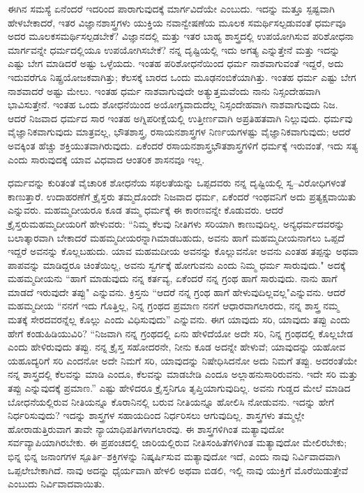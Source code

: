 ಈಗಿನ ಸಮಸ್ಯೆ ಏನೆಂದರೆ ಇದರಿಂದ ಪಾರಾಗುವುದಕ್ಕೆ ಮಾರ್ಗವಿದೆಯೇ ಎಂಬುದು. ಇದನ್ನು ಮತ್ತೂ ಸ್ಪಷ್ಟವಾಗಿ ಹೇಳಬೇಕಾದರೆ, ಇತರ ವಿಜ್ಞಾನಶಾಸ್ತ್ರಗಳು ಯುಕ್ತಿಯ ನವಾನ್ವೇಷಣೆಯ ಮೂಲಕ ಸಮರ್ಥಿಸಲ್ಪಡುವಂತೆ ಧರ್ಮವೂ ಅದರ ಮೂಲಕ\break ಸಮರ್ಥಿಸಲ್ಪಡಬೇಕೆ? ವಿಜ್ಞಾನದಲ್ಲಿ ಮತ್ತು ಇತರ ಬಾಹ್ಯ ಶಾಸ್ತ್ರದಲ್ಲಿ ಉಪಯೋಗಿಸುವ ಪರಿಶೋಧನಾ ಮಾರ್ಗವನ್ನೇ ಧರ್ಮದಲ್ಲಿಯೂ ಉಪಯೋಗಿಸಬೇಕೆ? ನನ್ನ ದೃಷ್ಟಿಯಲ್ಲಿ ಇದು ಅಗತ್ಯ ಎನ್ನುತ್ತೇನೆ ಮತ್ತು ಇದನ್ನು ಎಷ್ಟು ಬೇಗ ಮಾಡಿದರೆ ಅಷ್ಟು ಒಳ್ಳೆಯದು. ಇಂತಹ ಪರಿಶೋಧನೆಯಿಂದ ಧರ್ಮ ನಾಶವಾಗುವಂತೆ ಇದ್ದರೆ, ಅದು ಇದುವರೆಗೂ ನಿಷ್ಪ್ರಯೋಜಕವಾಗಿತ್ತು; ಕೆಲಸಕ್ಕೆ ಬಾರದ ಒಂದು ಮೂಢನಂಬಿಕೆಯಾಗಿತ್ತು. ಇಂತಹ ಧರ್ಮ ಎಷ್ಟು ಬೇಗ ನಾಶವಾದರೆ ಅಷ್ಟು ಮೇಲು. ಇಂತಹ ಧರ್ಮ ನಾಶವಾಗುವುದೇ ಅತ್ಯುತ್ತಮವೆಂದು ನಾನು ನಿಸ್ಸಂದೇಹವಾಗಿ ಭಾವಿಸುತ್ತೇನೆ. ಇಂತಹ ಒಂದು ಶೋಧನೆಯಿಂದ ಅಯೋಗ್ಯವಾದುದೆಲ್ಲ ನಿಸ್ಸಂದೇಹವಾಗಿ ನಾಶವಾಗುವುದು ನಿಜ. ಆದರೆ ನಿಜವಾದ ಧರ್ಮದ ಸಾರ ಇಂತಹ ಅಗ್ನಿಪರೀಕ್ಷೆಯಲ್ಲಿ ಉತ್ತೀರ್ಣವಾಗಿ ಅಪ್ರತಿಹತವಾಗಿ ನಿಲ್ಲುವುದು. ಧರ್ಮವು ವೈಜ್ಞಾನಿಕವಾಗುವುದು ಮಾತ್ರವಲ್ಲ, ಭೌತಶಾಸ್ತ್ರ, ರಸಾಯನಶಾಸ್ತ್ರಗಳ ನಿರ್ಣಯಗಳಷ್ಟು ವೈಜ್ಞಾನಿಕವಾಗುವುದು; ಆದರೆ ಅವಕ್ಕಿಂತ ಹೆಚ್ಚು ಶಕ್ತಿಯುತವಾಗಿರುವುದು. ಏಕೆಂದರೆ ರಸಾಯನಶಾಸ್ತ್ರಭೌತಶಾಸ್ತ್ರಗಳಿಗೆ ಧರ್ಮಕ್ಕೆ ಇರುವಂತೆ, ಇದು ಸತ್ಯ ಎಂದು ಸಾರುವುದಕ್ಕೆ ಯಾವ ವಿಧವಾದ ಆಂತರಿಕ ಶಾಸನವೂ ಇಲ್ಲ.

ಧರ್ಮವನ್ನು ಕುರಿತಂತೆ ವೈಚಾರಿಕ ಶೋಧನೆಯ ಸಫಲತೆಯನ್ನು ಒಪ್ಪದವರು ನನ್ನ ದೃಷ್ಟಿಯಲ್ಲಿ ಸ್ವ–ವಿರೋಧಿಗಳಂತೆ ಕಾಣುತ್ತಾರೆ. ಉದಾಹರಣೆಗೆ ಕ್ರೈಸ್ತರು ತಮ್ಮದೊಂದೇ ನಿಜವಾದ ಧರ್ಮ, ಏಕೆಂದರೆ ಇಂಥವನಿಗೆ ಅದು ಪ್ರತ್ಯಕ್ಷವಾಯಿತು ಎನ್ನುವರು. ಮಹಮ್ಮದೀಯರೂ ಕೂಡ ತಮ್ಮ ಧರ್ಮಕ್ಕೆ ಈ ಕಾರಣವನ್ನೇ ಕೊಡುವರು. ಆದರೆ ಕ್ರೈಸ್ತರು\break ಮಹಮ್ಮದೀಯರಿಗೆ ಹೇಳುವರು: “ನಿಮ್ಮ ಕೆಲವು ನೀತಿಗಳು ಸರಿಯಾಗಿ ಕಾಣುವುದಿಲ್ಲ. ಅನ್ಯಧರ್ಮದವರನ್ನು ಬಲಾತ್ಕಾರವಾಗಿ ಬೇಕಾದರೆ ಮಹಮ್ಮದೀಯರನ್ನಾಗಿ\break ಮಾಡಬಹುದು, ಅವನು ಹಾಗೆ ಮಹಮ್ಮದೀಯನಾಗಲು ಒಪ್ಪದೆ ಇದ್ದರೆ ಅವನನ್ನು ಕೊಲ್ಲಬಹುದು. ಯಾವ ಮಹಮದೀಯ ಅವನನ್ನು ಕೊಲ್ಲುವನೋ ಅವನು ಎಂತಹ ತಪ್ಪನ್ನು ಅಥವಾ ಪಾಪವನ್ನು ಮಾಡಿದ್ದರೂ ಚಿಂತೆಯಿಲ್ಲ, ಅವನು ಸ್ವರ್ಗಕ್ಕೆ ಹೋಗುವನು ಎಂದು ನಿಮ್ಮ ಧರ್ಮ ಸಾರುವುದು." ಅದಕ್ಕೆ ಮಹಮ್ಮದೀಯನು “ಹಾಗೆ ಮಾಡುವುದು ನನ್ನ ಕರ್ತವ್ಯ, ಏಕೆಂದರೆ ನನ್ನ ಗ್ರಂಥ ಹಾಗೆ ಸಾರುವುದು. ನಾನು ಹಾಗೆ ಮಾಡದೆ ಇರುವುದೇ ತಪ್ಪು" ಎನ್ನುವನು. ಕ್ರಿಸ್ತನು “ಆದರೆ ನನ್ನ ಗ್ರಂಥ ಹಾಗೆ ಹೇಳುವುದಿಲ್ಲವಲ್ಲ"\break ಎನ್ನುವನು. ಆದರೆ ಮಹಮ್ಮದೀಯ “ನನಗೆ ಇದು ಗೊತ್ತಿಲ್ಲ, ನಿನ್ನ ಗ್ರಂಥದ ಪ್ರಮಾಣ ನನಗೆ ಆಧಾರವಾಗಲಾರದು, ನನ್ನ ಶಾಸ್ತ್ರ ನಮ್ಮ ಮತಕ್ಕೆ ಸೇರದವರನ್ನೆಲ್ಲ ಕೊಲ್ಲು ಎಂದು ವಿಧಿಸುವುದು'' ಎನ್ನುವನು. ಈಗ ಯಾವುದು ಸರಿ, ಯಾವುದು ತಪ್ಪು ಎಂದು ಹೇಗೆ ಕಂಡುಹಿಡಿಯುವಿರಿ? “ನಿಜವಾಗಿ ನನ್ನ ಗ್ರಂಥದಲ್ಲಿ ಏನು ಹೇಳಿದೆಯೋ ಅದೇ ಸರಿ, ನಿನ್ನ ಗ್ರಂಥದಲ್ಲಿ ಕೊಲ್ಲಬೇಡ ಎಂದು ಹೇಳಿರುವುದು ತಪ್ಪು. ನನ್ನ ಕ್ರೈಸ್ತ ಸಹೋದರನೇ, ನೀನು ಕೂಡ ಅದನ್ನೇ ಹೇಳುವೆ; ಯಾವುದನ್ನು ಯಹೋವ ಯಹೂದ್ಯರಿಗೆ ಸರಿ ಎಂದನೋ ಅದೇ ನಿಮಗೆ ಸರಿ, ಯಾವುದನ್ನು ನಿಷೇಧಿಸಿದನೋ ಅದು ನಿಮಗೆ ತಪ್ಪು. ಅದರಂತೆಯೇ ನನ್ನ ಶಾಸ್ತ್ರದಲ್ಲಿ ಕೆಲವನ್ನು ಮಾಡಿ ಎಂದೂ, ಕೆಲವನ್ನು ಮಾಡಬೇಡಿ ಎಂದೂ ಅಲ್ಲಾಹನು\break ಸಾರಿರುವನು. ಇದೇ ಸರಿ ಮತ್ತು ತಪ್ಪು ಎನ್ನುವುದಕ್ಕೆ ಪ್ರಮಾಣ.” ಎಷ್ಟು ಹೇಳಿದರೂ ಕ್ರೈಸ್ತನಿಗೂ ತೃಪ್ತಿಯಾಗುವುದಿಲ್ಲ. ಅವನು ಗುಡ್ಡದ ಮೇಲೆ ಮಾಡಿದ ಬೋಧನೆಯಲ್ಲಿರುವ ನೀತಿಯನ್ನೂ ಕೊರಾನಿನಲ್ಲಿ ಬರುವ ನೀತಿಯನ್ನೂ ಹೋಲಿಸಿ ನೋಡುವನು. ಇದನ್ನು ಹೇಗೆ ನಿರ್ಧರಿಸುವುದು? ಇದನ್ನು ಶಾಸ್ತ್ರಗಳ ಸಹಾಯದಿಂದ ನಿರ್ಧರಿಸಲು ಆಗುವುದಿಲ್ಲ. ಶಾಸ್ತ್ರಗಳು ತಮ್ಮಲ್ಲೇ ಹೋರಾಡುತ್ತಿರುವಾಗ ತಾವೇ ನ್ಯಾಯಾಧಿಪತಿಗಳಾಗಲಾರವು. ಈ ಶಾಸ್ತ್ರಗಳಿಗಿಂತ ಮತ್ಯಾವುದೋ ಸರ್ವವ್ಯಾಪಿಯಾಗಿರಬೇಕು. ಈ ಪ್ರಪಂಚದಲ್ಲಿ ಜಾರಿಯಲ್ಲಿರುವ ನೀತಿಸಂಹಿತೆಗಳಿಗಿಂತ ಮತ್ಯಾವುದೋ ಮೇಲಿರಬೇಕು; ಭಿನ್ನ ಭಿನ್ನ ಜನಾಂಗಗಳ ಸ್ಪೂರ್ತಿ–ಶಕ್ತಿಗಳನ್ನು ನಿಷ್ಕರ್ಷಿಸುವ ಮತ್ಯಾವುದೋ ಇದೆ, ಎಂದು ನಾವು ನಿರ್ವಿವಾದವಾಗಿ ಒಪ್ಪಲೇಬೇಕಾಗಿದೆ. ನಾವು ಅದನ್ನು ಧೈರ್ಯವಾಗಿ ಹೇಳಲಿ ಅಥವಾ ಬಿಡಲಿ, ಇಲ್ಲಿ ನಾವು ಯುಕ್ತಿಗೆ ಮೊರೆಯಿಡುತ್ತೇವೆ ಎಂಬುದು ನಿರ್ವಿವಾದವಾಯಿತು.

